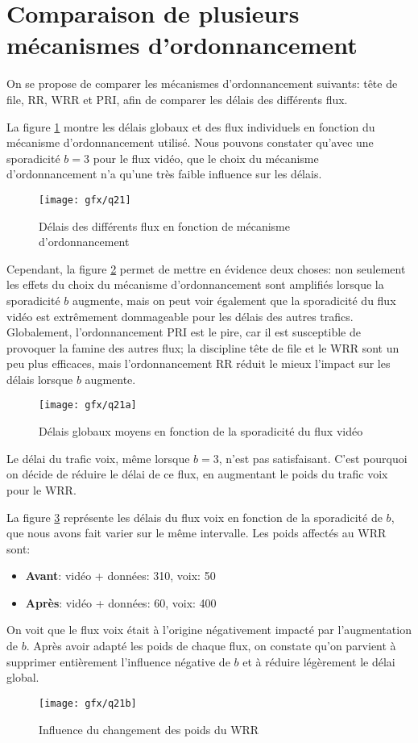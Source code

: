 \section{Comparaison de plusieurs mécanismes d'ordonnancement}

On se propose de comparer les mécanismes d'ordonnancement suivants: tête de
file, RR, WRR et PRI, afin de comparer les délais des différents flux.

La figure \ref{fig:q21} montre les délais globaux et des flux individuels en
fonction du mécanisme d'ordonnancement utilisé.  Nous pouvons constater qu'avec
une sporadicité $b = 3$ pour le flux vidéo, que le choix du mécanisme
d'ordonnancement n'a qu'une très faible influence sur les délais.

\begin{figure}[htb]
	\centering
	\texttt{[image: gfx/q21]}
	\caption{Délais des différents flux en fonction de mécanisme
	d'ordonnancement}
	\label{fig:q21}
\end{figure}

Cependant, la figure \ref{fig:q21a} permet de mettre en évidence deux choses:
non seulement les effets du choix du mécanisme d'ordonnancement sont amplifiés
lorsque la sporadicité $b$ augmente, mais on peut voir également que la
sporadicité du flux vidéo est extrêmement dommageable pour les délais des autres
trafics.  Globalement, l'ordonnancement PRI est le pire, car il est susceptible
de provoquer la famine des autres flux; la discipline tête de file et le WRR
sont un peu plus efficaces, mais l'ordonnancement RR réduit le mieux l'impact
sur les délais lorsque $b$ augmente.

\begin{figure}[htb]
	\centering
	\texttt{[image: gfx/q21a]}
	\caption{Délais globaux moyens en fonction de la sporadicité du flux
	vidéo}
	\label{fig:q21a}
\end{figure}

Le délai du trafic voix, même lorsque $b = 3$, n'est pas satisfaisant.  C'est
pourquoi on décide de réduire le délai de ce flux, en augmentant le poids du
trafic voix pour le WRR.

La figure \ref{fig:q21b} représente les délais du flux voix en fonction de la
sporadicité de $b$, que nous avons fait varier sur le même intervalle.  Les
poids affectés au WRR sont:
\begin{itemize}
	\item \textbf{Avant}: vidéo + données: 310, voix: 50
	\item \textbf{Après}: vidéo + données: 60, voix: 400
\end{itemize}

On voit que le flux voix était à l'origine négativement impacté par
l'augmentation de $b$.  Après avoir adapté les poids de chaque flux, on constate
qu'on parvient à supprimer entièrement l'influence négative de $b$ et à réduire
légèrement le délai global.

\begin{figure}[htb]
	\centering
	\texttt{[image: gfx/q21b]}
	\caption{Influence du changement des poids du WRR}
	\label{fig:q21b}
\end{figure}

